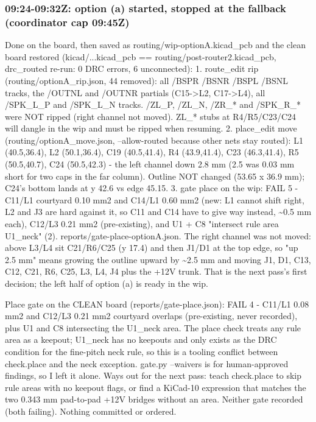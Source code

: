 \documentclass[11pt]{article}
\begin{document}
\subsubsection*{09:24-09:32Z: option (a) started, stopped at the fallback (coordinator cap 09:45Z)}
Done on the board, then saved as routing/wip-optionA.kicad\_pcb and the clean board restored (kicad/...kicad\_pcb == routing/post-router2.kicad\_pcb, drc\_routed re-run: 0 DRC errors, 6 unconnected): 1. route\_edit rip (routing/optionA\_rip.json, 44 removed): all /BSPR /BSNR /BSPL /BSNL tracks, the /OUTNL and /OUTNR partials (C15-\textgreater{}L2, C17-\textgreater{}L4), all /SPK\_L\_P and /SPK\_L\_N tracks. /ZL\_P, /ZL\_N, /ZR\_{*} and /SPK\_R\_{*} were NOT ripped (right channel not moved). ZL\_{*} stubs at R4/R5/C23/C24 will dangle in the wip and must be ripped when resuming. 2. place\_edit move (routing/optionA\_move.json, --allow-routed because other nets stay routed): L1 (40.5,36.4), L2 (50.1,36.4), C19 (40.5,41.4), R4 (43.9,41.4), C23 (46.3,41.4), R5 (50.5,40.7), C24 (50.5,42.3) - the left channel down 2.8 mm (2.5 was 0.03 mm short for two caps in the far column). Outline NOT changed (53.65 x 36.9 mm); C24's bottom lands at y 42.6 vs edge 45.15. 3. gate place on the wip: FAIL 5 - C11/L1 courtyard 0.10 mm2 and C14/L1 0.60 mm2 (new: L1 cannot shift right, L2 and J3 are hard against it, so C11 and C14 have to give way instead, \textasciitilde{}0.5 mm each), C12/L3 0.21 mm2 (pre-existing), and U1 + C8 "intersect rule area U1\_neck" (2). reports/gate-place-optionA.json. The right channel was not moved: above L3/L4 sit C21/R6/C25 (y 17.4) and then J1/D1 at the top edge, so "up 2.5 mm" means growing the outline upward by \textasciitilde{}2.5 mm and moving J1, D1, C13, C12, C21, R6, C25, L3, L4, J4 plus the +12V trunk. That is the next pass's first decision; the left half of option (a) is ready in the wip.

Place gate on the CLEAN board (reports/gate-place.json): FAIL 4 - C11/L1 0.08 mm2 and C12/L3 0.21 mm2 courtyard overlaps (pre-existing, never recorded), plus U1 and C8 intersecting the U1\_neck area. The place check treats any rule area as a keepout; U1\_neck has no keepouts and only exists as the DRC condition for the fine-pitch neck rule, so this is a tooling conflict between check.place and the neck exception. gate.py --waivers is for human-approved findings, so I left it alone. Ways out for the next pass: teach check.place to skip rule areas with no keepout flags, or find a KiCad-10 expression that matches the two 0.343 mm pad-to-pad +12V bridges without an area. Neither gate recorded (both failing). Nothing committed or ordered.
\end{document}
